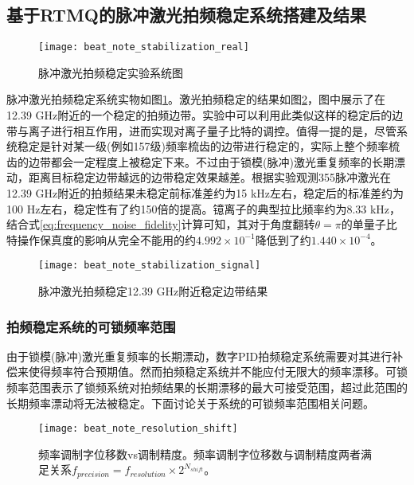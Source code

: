 \subsection[基于RTMQ的脉冲激光拍频稳定系统搭建及结果]{基于RTMQ的脉冲激光拍频稳定系统搭建及结果}


\begin{figure}
    \centering
    \texttt{[image: beat\_note\_stabilization\_real]}
    \caption[脉冲激光拍频稳定实验系统图]{脉冲激光拍频稳定实验系统图\label{fig:beat_note_stabilization_real}}
\end{figure}

脉冲激光拍频稳定系统实物如图\ref{fig:beat_note_stabilization_real}。激光拍频稳定的结果如图\ref{fig:beat_note_stabilization_signal}，图中展示了在12.39 GHz附近的一个稳定的拍频边带。实验中可以利用此类似这样的稳定后的边带与离子进行相互作用，进而实现对离子量子比特的调控。值得一提的是，尽管系统稳定是针对某一级(例如157级)频率梳齿的边带进行稳定的，实际上整个频率梳齿的边带都会一定程度上被稳定下来。不过由于锁模(脉冲)激光重复频率的长期漂动，距离目标稳定边带越远的边带稳定效果越差。根据实验观测355脉冲激光在12.39 GHz附近的拍频结果未稳定前标准差约为15 kHz左右，稳定后的标准差约为100 Hz左右，稳定性有了约150倍的提高。镱离子的典型拉比频率约为8.33 kHz，结合式\eqref{eq:frequency_noise_fidelity}计算可知，其对于角度翻转$\theta=\pi$的单量子比特操作保真度的影响从完全不能用的约$4.992\times 10^{-1}$降低到了约$1.440\times 10^{-4}$。


\begin{figure}
    \centering
    \texttt{[image: beat\_note\_stabilization\_signal]}
    \caption[脉冲激光拍频稳定12.39 GHz附近稳定边带结果]{脉冲激光拍频稳定12.39 GHz附近稳定边带结果\label{fig:beat_note_stabilization_signal}}
\end{figure}

\subsubsection[拍频稳定系统的可锁频率范围]{拍频稳定系统的可锁频率范围}
由于锁模(脉冲)激光重复频率的长期漂动，数字PID拍频稳定系统需要对其进行补偿来使得频率符合预期值。然而拍频稳定系统并不能应付无限大的频率漂移。可锁频率范围表示了锁频系统对拍频结果的长期漂移的最大可接受范围，超过此范围的长期频率漂动将无法被稳定。下面讨论关于系统的可锁频率范围相关问题。

\begin{figure}
    \centering
    \texttt{[image: beat\_note\_resolution\_shift]}
    \caption[频率调制字位移数vs调制精度
    ]{频率调制字位移数vs调制精度。频率调制字位移数与调制精度两者满足关系$f_{precision}=f_{resolution}\times2^{N_{shift}}$。
    \label{fig:beat_note_resolution_shift}}
\end{figure}

